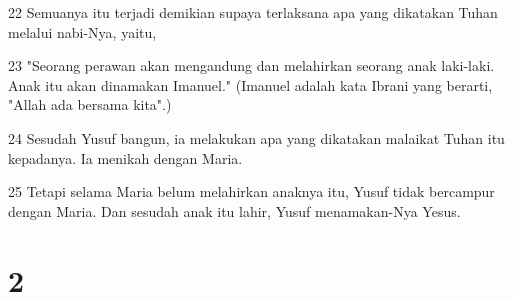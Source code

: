 \par 22 Semuanya itu terjadi demikian supaya terlaksana apa yang dikatakan Tuhan melalui nabi-Nya, yaitu,
\par 23 "Seorang perawan akan mengandung dan melahirkan seorang anak laki-laki. Anak itu akan dinamakan Imanuel." (Imanuel adalah kata Ibrani yang berarti, "Allah ada bersama kita".)
\par 24 Sesudah Yusuf bangun, ia melakukan apa yang dikatakan malaikat Tuhan itu kepadanya. Ia menikah dengan Maria.
\par 25 Tetapi selama Maria belum melahirkan anaknya itu, Yusuf tidak bercampur dengan Maria. Dan sesudah anak itu lahir, Yusuf menamakan-Nya Yesus.

\chapter{2}

